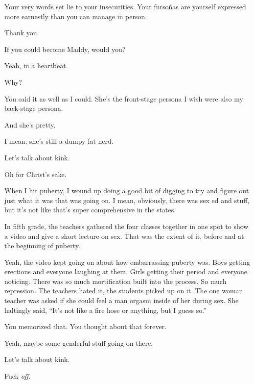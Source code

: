 \begin{leftcolumn}
\begin{ally}
Your very words set lie to your insecurities. Your fursoñas are yourself expressed more earnestly than you can manage in person.
\end{ally}
Thank you.

\begin{ally}
If you could become Maddy, would you?
\end{ally}
Yeah, in a heartbeat.

\begin{ally}
Why?
\end{ally}
You said it as well as I could. She's the front-stage persona I wish were also my back-stage persona.

\begin{ally}
And she's pretty.
\end{ally}
I mean, she's still a dumpy fat nerd.

\begin{ally}
Let's talk about kink.
\end{ally}
Oh for Christ's sake.
\newpage

When I hit puberty, I wound up doing a good bit of digging to try and figure out just what it was that was going on. I mean, obviously, there was sex ed and stuff, but it's not like that's super comprehensive in the states.

\begin{ally}
In fifth grade, the teachers gathered the four classes together in one spot to show a video and give a short lecture on sex. That was the extent of it, before and at the beginning of puberty.
\end{ally}
Yeah, the video kept going on about how embarrassing puberty was. Boys getting erections and everyone laughing at them. Girls getting their period and everyone noticing. There was so much mortification built into the process. So much repression. The teachers hated it, the students picked up on it. The one woman teacher was asked if she could feel a man orgasm inside of her during sex. She haltingly said, ``It's not like a fire hose or anything, but I guess so.''

\begin{ally}
You memorized that. You thought about that forever.
\end{ally}
Yeah, maybe some genderful stuff going on there.

\begin{ally}
Let's talk about kink.
\end{ally}
Fuck \emph{off}.


\end{leftcolumn}
